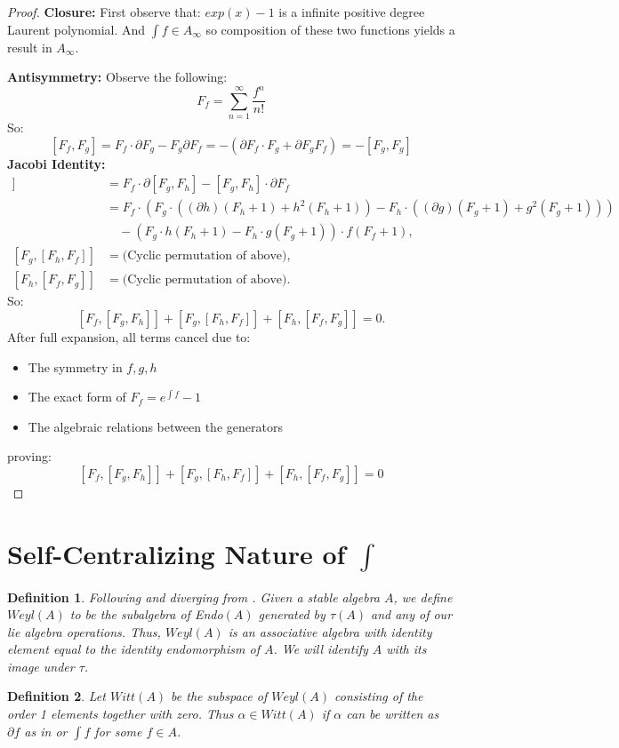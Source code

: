 \documentclass[10pt, oneside]{article}
\newtheorem{defn}{Definition}
\begin{document}
\begin{proof}

\noindent\textbf{Closure:}
First observe that: $exp(x)-1$ is a infinite positive degree Laurent polynomial. And $\int f \in A_\infty$ so composition of these two functions yields a result in $A_\infty$.

\noindent\textbf{Antisymmetry:}
Observe the following:
\[
F_f = \sum_{n=1}^{\infty} \frac{f^n}{n!} 
\]
So:
\[
[F_f, F_g] = F_f \cdot \partial F_g - F_g \partial F_f = -( \partial F_f \cdot F_g + \partial F_g F_f) = -[F_g, F_g]
\]
\noindent\textbf{Jacobi Identity:}
\begin{align*}
[F_f, [F_g, F_h]] &= F_f \cdot \partial[F_g, F_h] - [F_g, F_h] \cdot \partial F_f \\
&= F_f \cdot \left(F_g \cdot \left((\partial h)(F_h + 1) + h^2 (F_h + 1)\right) - F_h \cdot \left((\partial g)(F_g + 1) + g^2 (F_g + 1)\right)\right) \\
&\quad - \left(F_g \cdot h (F_h + 1) - F_h \cdot g (F_g + 1)\right) \cdot f (F_f + 1), \\
[F_g, [F_h, F_f]] &= \text{(Cyclic permutation of above)}, \\
[F_h, [F_f, F_g]] &= \text{(Cyclic permutation of above)}.
\end{align*}
So:
\[
\boxed{[F_f, [F_g, F_h]] + [F_g, [F_h, F_f]] + [F_h, [F_f, F_g]] = 0.}
\]
After full expansion, all terms cancel due to:
\begin{itemize}
\item The symmetry in $f,g,h$
\item The exact form of $F_f = e^{\int f} -1$
\item The algebraic relations between the generators
\end{itemize}
proving:
\[
\boxed{[F_f, [F_g, F_h]] + [F_g, [F_h, F_f]] + [F_h, [F_f, F_g]] = 0}
\]
\end{proof}
\section{Self-Centralizing Nature of $\int$}
\begin{defn}
Following \cite{pakianathan2010generalizedwittalgebrasvariable} and diverging from \cite{Dokovic1998}. Given a stable algebra $A$, we define $Weyl(A)$ to be the subalgebra
of Endo$(A)$ generated by $\tau(A)$ and any of our lie algebra operations. Thus,
$Weyl(A)$ is an associative algebra with identity element equal to 
the identity endomorphism of $A$. We will identify $A$ with its image under $\tau$.
\end{defn}
\begin{defn}
Let $Witt(A)$ be the subspace of $Weyl(A)$ consisting of the order 1 elements
together with zero. Thus $\alpha \in Witt(A)$ if $\alpha$ can be written
as $\partial f$ as in \cite{pakianathan2010generalizedwittalgebrasvariable} or $\int f$ for some $f \in A$. 
\end{defn}
\end{document}
